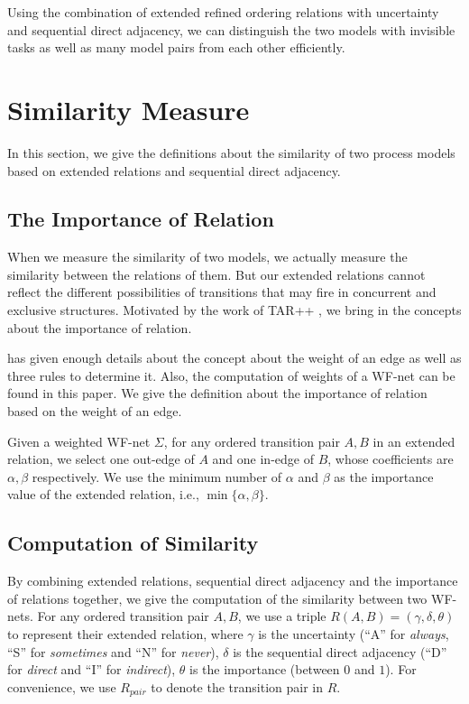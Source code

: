 \documentclass{llncs}
\begin{document}
Using the combination of extended refined ordering relations with uncertainty and sequential direct adjacency, we can distinguish the two models with invisible tasks as well as many model pairs from each other efficiently.

\section{Similarity Measure}\label{sec:similarity}
In this section, we give the definitions about the similarity of two process models based on extended relations and sequential direct adjacency.

\subsection{The Importance of Relation}\label{subsec:importance}
When we measure the similarity of two models, we actually measure the similarity between the relations of them. But our extended relations cannot reflect the different possibilities of transitions that may fire in concurrent and exclusive structures. Motivated by the work of TAR++ \cite{wang2015tar++}, we bring in the concepts about the importance of relation.

\cite{wang2015tar++} has given enough details about the concept about the weight of an edge as well as three rules to determine it. Also, the computation of weights of a WF-net can be found in this paper. We give the definition about the importance of relation based on the weight of an edge.

\begin{definition}\label{def:importance}
Given a weighted WF-net $\Sigma$, for any ordered transition pair $A,B$ in an extended relation, we select one out-edge of $A$ and one in-edge of $B$, whose coefficients are $\alpha,\beta$ respectively. We use the minimum number of $\alpha$ and $\beta$ as the importance value of the extended relation, i.e., $\min\{\alpha,\beta\}$.
\end{definition}

\subsection{Computation of Similarity}\label{subsec:computation}
By combining extended relations, sequential direct adjacency and the importance of relations together, we give the computation of the similarity between two WF-nets. For any ordered transition pair $A,B$, we use a triple $R(A,B)=(\gamma,\delta,\theta)$ to represent their extended relation, where $\gamma$ is the uncertainty (``A'' for \textit{always}, ``S'' for \textit{sometimes} and ``N'' for \textit{never}), $\delta$ is the sequential direct adjacency (``D'' for \textit{direct} and ``I'' for \textit{indirect}), $\theta$ is the importance (between $0$ and $1$). For convenience, we use $R_{pair}$ to denote the transition pair in $R$.
\end{document}
